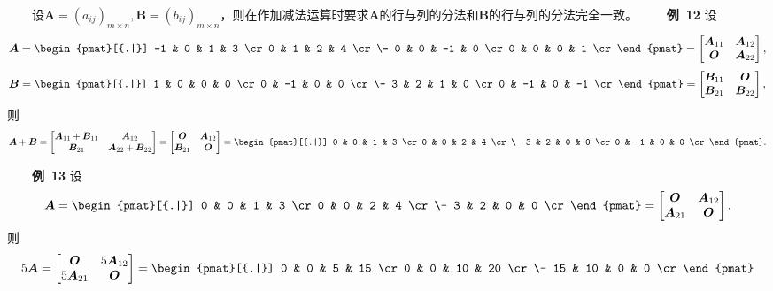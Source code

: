 \documentclass[compress,mathserif,cjk]{beamer}
\theoremstyle{remark}
\numberwithin{equation}{section}
\newcommand{\hei}{\bf}      %
\begin{document}
\begin{CJK}{UTF8}{gbsn}
\begin{frame}
\ \ \ \ 设$\bm A=(a_{ij})_{m\times n},\bm B=(b_{ij})_{m\times n}$，则在作加减法运算时要求$\bm A$的行与列的分法和$\bm B$的行与列的分法完全一致。
\pause\vskip 5pt
\ \ \ \ {\hei 例~12} 设
$$\bm A=\begin{pmat}[{.|}]
-1 & 0 & 1 & 3 \cr
0 & 1 & 2 & 4 \cr\-
0 & 0 & -1 & 0 \cr
0 & 0 & 0 & 1 \cr
\end{pmat}=\left[\begin{matrix}\bm A_{11}&\bm A_{12}\\\bm O&\bm A_{22}\end{matrix}\right],$$
$$\bm B=\begin{pmat}[{.|}]
1 & 0 & 0 & 0 \cr
0 & -1 & 0 & 0 \cr\-
3 & 2 & 1 & 0 \cr
0 & -1 & 0 & -1 \cr
\end{pmat}=\left[\begin{matrix}\bm B_{11}&\bm O\\\bm B_{21}&\bm B_{22}\end{matrix}\right],$$
则
$$\bm A+\bm B=\left[\begin{matrix}\bm A_{11}+\bm B_{11}&\bm A_{12}\\\bm B_{21}&\bm A_{22}+\bm B_{22}\end{matrix}\right]
=\left[\begin{matrix}\bm O&\bm A_{12}\\\bm B_{21}&\bm O\end{matrix}\right]
=\begin{pmat}[{.|}]
0 & 0 & 1 & 3 \cr
0 & 0 & 2 & 4 \cr\-
3 & 2 & 0 & 0 \cr
0 & -1 & 0 & 0 \cr
\end{pmat}.$$
\end{frame}

\begin{frame}
\ \ \ \ {\hei 例~13} 设
$$\bm A=\begin{pmat}[{.|}]
0 & 0 & 1 & 3 \cr
0 & 0 & 2 & 4 \cr\-
3 & 2 & 0 & 0 \cr
\end{pmat}=\left[\begin{matrix}\bm O&\bm A_{12}\\\bm A_{21}&\bm O\end{matrix}\right],$$
则
$$5\bm A=\left[\begin{matrix}\bm O&5\bm A_{12}\\5\bm A_{21}&\bm O\end{matrix}\right]=
\begin{pmat}[{.|}]
0 & 0 & 5 & 15 \cr
0 & 0 & 10 & 20 \cr\-
15 & 10 & 0 & 0 \cr
\end{pmat}$$
\end{frame}



\end{CJK}
\end{document}
